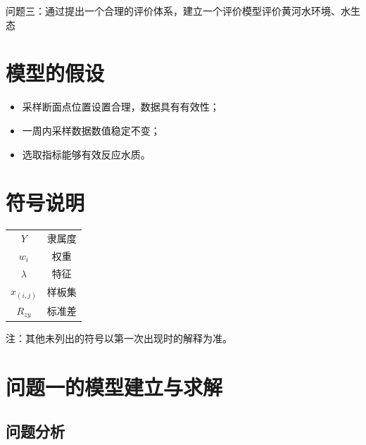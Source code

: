 \documentclass{whutmod}
\begin{document}
\begin{spacing}{1.2}
	问题三：通过提出一个合理的评价体系，建立一个评价模型评价黄河水环境、水生态

\section{模型的假设}

\begin{itemize}
		\item 采样断面点位置设置合理，数据具有有效性；
		\item 一周内采样数据数值稳定不变；
		\item 选取指标能够有效反应水质。
		
\end{itemize}






	\section{符号说明}
	\begin{center}
		\begin{tabular}{cc}
			\\\toprule[1.5pt]
			\makebox[0.3\textwidth][c]{符号} & \makebox[0.4\textwidth][c]{意义} \\ \hline
			$Y$                       & 隶属度            \\
			$w_i$                            & 权重                  \\
			$\lambda $                           & 特征                 \\
			$x_{(i,j)}$                       & 样板集                     \\
			$R_{zy}$                         & 标准差                   \\
			\bottomrule[1.5pt]
		\end{tabular}
	\end{center}
	注：其他未列出的符号以第一次出现时的解释为准。

	\clearpage




\section{问题一的模型建立与求解}

\subsection{问题分析}


\end{spacing}
\end{document}

